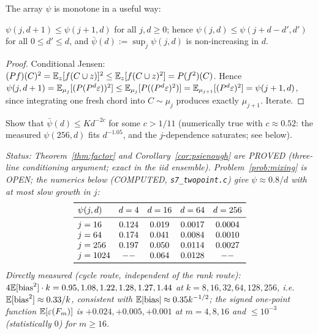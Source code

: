 The array $\psi$ is monotone in a useful way:

\begin{lemma}\label{lem:freeze}
$\psi(j,d+1)\le\psi(j+1,d)$ for all $j,d\ge0$; hence
$\psi(j,d)\le\psi(j+d-d',d')$ for all $0\le d'\le d$, and
$\bar\psi(d):=\sup_j\psi(j,d)$ is non-increasing in $d$.
\end{lemma}

\begin{proof}
Conditional Jensen: $(Pf)(C)^2=\mathbb{E}_z[f(C\cup z)]^2
\le\mathbb{E}_z[f(C\cup z)^2]=P(f^2)(C)$.  Hence
$\psi(j,d+1)=\mathbb{E}_{\mu_j}[(P(P^{d}\varepsilon))^2]
\le\mathbb{E}_{\mu_j}[P((P^{d}\varepsilon)^2)]
=\mathbb{E}_{\mu_{j+1}}[(P^{d}\varepsilon)^2]=\psi(j+1,d)$, since
integrating one fresh chord into $C\sim\mu_j$ produces exactly
$\mu_{j+1}$.  Iterate.
\end{proof}

\begin{problem}\label{prob:mixing}
Show that $\bar\psi(d)\le K d^{-2c}$ for some
$c>1/11$ (numerically true with $c\approx0.52$: the measured
$\psi(256,d)$ fits $d^{-1.05}$, and the $j$-dependence saturates;
see below).
\end{problem}

\emph{Status: Theorem~\ref{thm:factor} and
Corollary~\ref{cor:psienough} are PROVED (three-line conditioning
argument; exact in the iid ensemble).  Problem~\ref{prob:mixing} is
OPEN; the numerics below (COMPUTED, \texttt{s7\_twopoint.c}) give
$\psi\approx0.8/d$ with at most slow growth in $j$:}
\[
\begin{array}{lcccc}
\toprule
\psi(j,d) & d=4 & d=16 & d=64 & d=256\\
\midrule
j=16  & 0.124 & 0.019 & 0.0017 & 0.0004\\
j=64  & 0.174 & 0.041 & 0.0084 & 0.0010\\
j=256 & 0.197 & 0.050 & 0.0114 & 0.0027\\
j=1024&  --   & 0.064 & 0.0128 &  --  \\
\bottomrule
\end{array}
\]
\emph{Directly measured (cycle route, independent of the rank
route): $4\mathbb{E}[\mathrm{bias}^2]\cdot k=0.95,1.08,1.22,1.28,1.27,1.44$
at $k=8,16,32,64,128,256$, i.e.\
$\mathbb{E}[\mathrm{bias}^2]\approx0.33/k$, consistent with
$\mathbb{E}|\mathrm{bias}|\approx0.35k^{-1/2}$; the signed one-point
function $\mathbb{E}[\varepsilon(F_m)]$ is $+0.024,+0.005,+0.001$ at
$m=4,8,16$ and $\le10^{-3}$ (statistically $0$) for $m\ge16$.}

